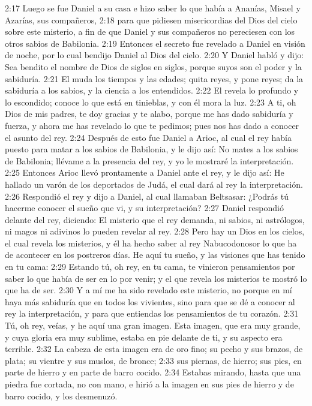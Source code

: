 2:17 Luego se fue Daniel a su casa e hizo saber lo que había a Ananías, Misael y Azarías, sus compañeros,  
2:18 para que pidiesen misericordias del Dios del cielo sobre este misterio, a fin de que Daniel y sus compañeros no pereciesen con los otros sabios de Babilonia.  
2:19 Entonces el secreto fue revelado a Daniel en visión de noche, por lo cual bendijo Daniel al Dios del cielo.  
2:20 Y Daniel habló y dijo: Sea bendito el nombre de Dios de siglos en siglos, porque suyos son el poder y la sabiduría.  
2:21 El muda los tiempos y las edades; quita reyes, y pone reyes; da la sabiduría a los sabios, y la ciencia a los entendidos.  
2:22 El revela lo profundo y lo escondido; conoce lo que está en tinieblas, y con él mora la luz.  
2:23 A ti, oh Dios de mis padres, te doy gracias y te alabo, porque me has dado sabiduría y fuerza, y ahora me has revelado lo que te pedimos; pues nos has dado a conocer el asunto del rey.  
2:24 Después de esto fue Daniel a Arioc, al cual el rey había puesto para matar a los sabios de Babilonia, y le dijo así: No mates a los sabios de Babilonia; llévame a la presencia del rey, y yo le mostraré la interpretación.  
2:25 Entonces Arioc llevó prontamente a Daniel ante el rey, y le dijo así: He hallado un varón de los deportados de Judá, el cual dará al rey la interpretación.  
2:26 Respondió el rey y dijo a Daniel, al cual llamaban Beltsasar: ¿Podrás tú hacerme conocer el sueño que vi, y su interpretación?  
2:27 Daniel respondió delante del rey, diciendo: El misterio que el rey demanda, ni sabios, ni astrólogos, ni magos ni adivinos lo pueden revelar al rey.  
2:28 Pero hay un Dios en los cielos, el cual revela los misterios, y él ha hecho saber al rey Nabucodonosor lo que ha de acontecer en los postreros días. He aquí tu sueño, y las visiones que has tenido en tu cama:  
2:29 Estando tú, oh rey, en tu cama, te vinieron pensamientos por saber lo que había de ser en lo por venir; y el que revela los misterios te mostró lo que ha de ser.  
2:30 Y a mí me ha sido revelado este misterio, no porque en mí haya más sabiduría que en todos los vivientes, sino para que se dé a conocer al rey la interpretación, y para que entiendas los pensamientos de tu corazón.  
2:31 Tú, oh rey, veías, y he aquí una gran imagen. Esta imagen, que era muy grande, y cuya gloria era muy sublime, estaba en pie delante de ti, y su aspecto era terrible.  
2:32 La cabeza de esta imagen era de oro fino; su pecho y sus brazos, de plata; su vientre y sus muslos, de bronce;  
2:33 sus piernas, de hierro; sus pies, en parte de hierro y en parte de barro cocido.  
2:34 Estabas mirando, hasta que una piedra fue cortada, no con mano, e hirió a la imagen en sus pies de hierro y de barro cocido, y los desmenuzó.  
